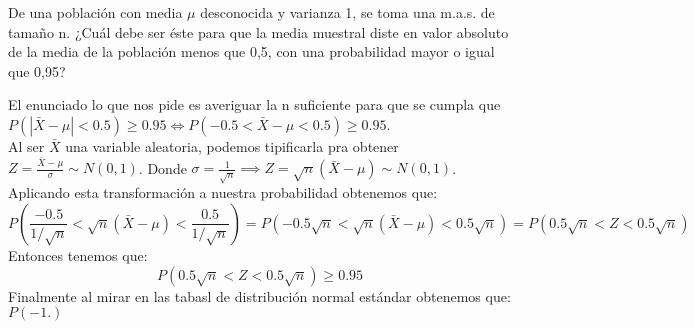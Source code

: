 \begin{problem}{2.2}
	De una población con media $\mu$ desconocida y varianza 1, se toma una m.a.s. de tamaño n. ¿Cuál debe ser éste para que la media muestral diste en valor absoluto de la media de la población menos que 0,5, con una probabilidad mayor o igual que 0,95?
\end{problem}
\begin{sol}
	El enunciado lo que nos pide es averiguar la n suficiente para que se cumpla que $P(|\bar{X}-\mu|<0.5)\geq 0.95 \iff P( -0.5 < \bar{X} - \mu < 0.5) \geq 0.95$.\\
	Al ser $\bar{X}$ una variable aleatoria, podemos tipificarla pra obtener $Z = \frac{\bar{X}-\mu}{\sigma} \sim N(0,1)$. Donde $\sigma = \frac{1}{\sqrt{n}} \implies Z = \sqrt{n}(\bar{X}-\mu) \sim N(0,1)$.\\
	Aplicando esta transformación a nuestra probabilidad obtenemos que: 
	$$P\left(\frac{-0.5}{1/\sqrt{n}} < \sqrt{n}(\bar{X}-\mu) < \frac{0.5}{1/\sqrt{n}}\right) = P\left(-0.5\sqrt{n} < \sqrt{n}(\bar{X}-\mu) < 0.5\sqrt{n}\right) = P\left(0.5\sqrt{n} < Z < 0.5\sqrt{n}\right)$$
	Entonces tenemos que: 
	$$P\left(0.5\sqrt{n} < Z < 0.5\sqrt{n}\right) \geq 0.95$$
	Finalmente al mirar en las tabasl de distribución normal estándar obtenemos que: $P(-1.)$
\end{sol}